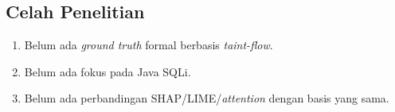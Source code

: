 
\subsection{Celah Penelitian}
\label{sec:celah}
\begin{petunjuk}
\begin{enumerate}
  \item Belum ada \textit{ground truth} formal berbasis \textit{taint-flow}.
  \item Belum ada fokus pada Java SQLi.
  \item Belum ada perbandingan SHAP/LIME/\textit{attention} dengan basis yang sama.
\end{enumerate}
\end{petunjuk}

